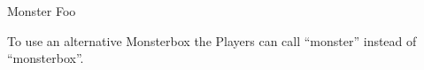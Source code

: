 \documentclass[10pt,twoside]{article}
\begin{document}
\begin{multicols}{2}
\begin{monsterbox}{Monster Foo}
	\begin{monsteraction}
		To use an alternative Monsterbox the Players can call "`monster"' instead of "`monsterbox"'.
	\end{monsteraction}
\end{monsterbox}
    
\end{multicols}
\end{document}
